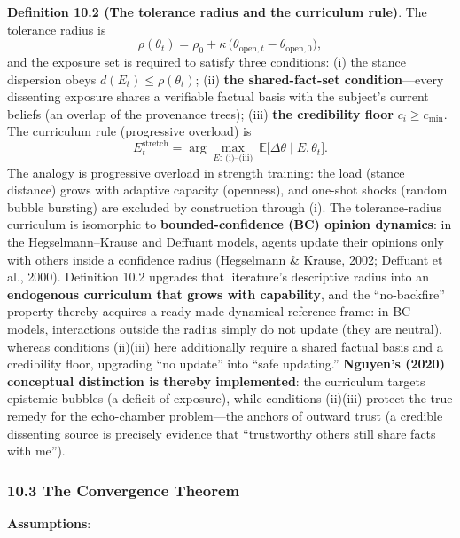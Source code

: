 \documentclass[
  11pt]{article}
\begin{document}
\textbf{Definition 10.2 (The tolerance radius and the curriculum rule)}.
The tolerance radius is
\[\rho(\theta_t) = \rho_0 + \kappa\,\big(\theta_{\mathrm{open},t} - \theta_{\mathrm{open},0}\big),\]
and the exposure set is required to satisfy three conditions: (i) the
stance dispersion obeys \(d(E_t) \le \rho(\theta_t)\); (ii) \textbf{the
shared-fact-set condition}---every dissenting exposure shares a
verifiable factual basis with the subject's current beliefs (an overlap
of the provenance trees); (iii) \textbf{the credibility floor}
\(c_i \ge c_{\min}\). The curriculum rule (progressive overload) is
\[E_t^{\mathrm{stretch}} = \arg\max_{E:\ \text{(i)–(iii)}}\ \mathbb{E}\big[\Delta\theta \mid E, \theta_t\big].\]
The analogy is progressive overload in strength training: the load
(stance distance) grows with adaptive capacity (openness), and one-shot
shocks (random bubble bursting) are excluded by construction through
(i). The tolerance-radius curriculum is isomorphic to
\textbf{bounded-confidence (BC) opinion dynamics}: in the
Hegselmann--Krause and Deffuant models, agents update their opinions
only with others inside a confidence radius (Hegselmann \& Krause, 2002;
Deffuant et al., 2000). Definition 10.2 upgrades that literature's
descriptive radius into an \textbf{endogenous curriculum that grows with
capability}, and the ``no-backfire'' property thereby acquires a
ready-made dynamical reference frame: in BC models, interactions outside
the radius simply do not update (they are neutral), whereas conditions
(ii)(iii) here additionally require a shared factual basis and a
credibility floor, upgrading ``no update'' into ``safe updating.''
\textbf{Nguyen's (2020) conceptual distinction is thereby implemented}:
the curriculum targets epistemic bubbles (a deficit of exposure), while
conditions (ii)(iii) protect the true remedy for the echo-chamber
problem---the anchors of outward trust (a credible dissenting source is
precisely evidence that ``trustworthy others still share facts with
me'').

\subsubsection{10.3 The Convergence
Theorem}\label{the-convergence-theorem}

\textbf{Assumptions}:
\end{document}
